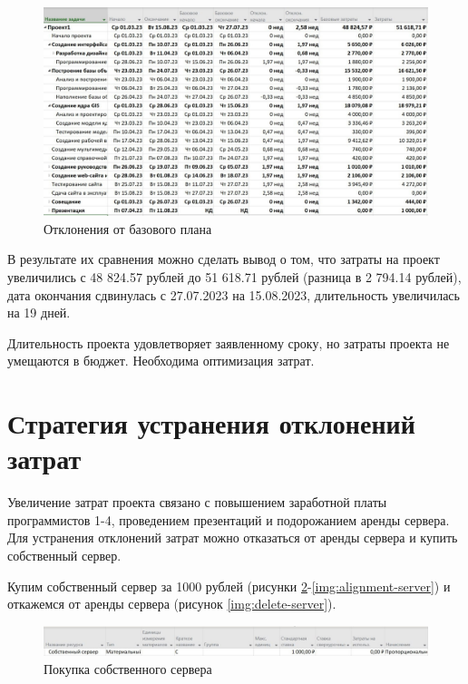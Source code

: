 \begin{figure}[H]
	\begin{center}
		\includegraphics[scale=0.3]{inc/img/deviation.jpg}
	\end{center}
	\captionsetup{justification=centering}
	\caption{Отклонения от базового плана}
	\label{img:deviation}
\end{figure}

В результате их сравнения можно сделать вывод о том, что затраты на проект увеличились с 48 824.57 рублей до 51 618.71 рублей (разница в 2 794.14 рублей), дата окончания сдвинулась с 27.07.2023 на 15.08.2023, длительность увеличилась на 19 дней.

Длительность проекта удовлетворяет заявленному сроку, но затраты проекта не умещаются в бюджет. Необходима оптимизация затрат. 

\section*{Стратегия устранения отклонений затрат}

Увеличение затрат проекта связано с повышением заработной платы программистов 1-4, проведением презентаций и подорожанием аренды сервера. Для устранения отклонений затрат можно отказаться от аренды сервера и купить собственный сервер.

Купим собственный сервер за 1000 рублей (рисунки \ref{img:new-server}-\ref{img:alignment-server}) и откажемся от аренды сервера (рисунок \ref{img:delete-server}).

\begin{figure}[H]
	\begin{center}
		\includegraphics[scale=0.3]{inc/img/new-server.jpg}
	\end{center}
	\captionsetup{justification=centering}
	\caption{Покупка собственного сервера}
	\label{img:new-server}
\end{figure}

